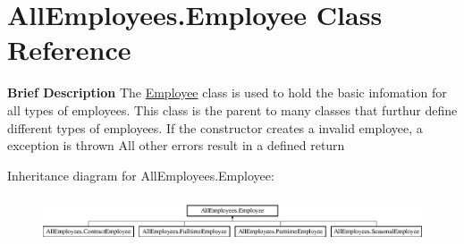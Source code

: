 \hypertarget{class_all_employees_1_1_employee}{}\section{All\+Employees.\+Employee Class Reference}
\label{class_all_employees_1_1_employee}


{\bfseries Brief Description} The \hyperlink{class_all_employees_1_1_employee}{Employee} class is used to hold the basic infomation for all types of employees. This class is the parent to many classes that furthur define different types of employees. If the constructor creates a invalid employee, a exception is thrown All other errors result in a defined return  


Inheritance diagram for All\+Employees.\+Employee\+:\begin{figure}[H]
\begin{center}
\leavevmode
\includegraphics[height=1.352657cm]{class_all_employees_1_1_employee}
\end{center}
\end{figure}
